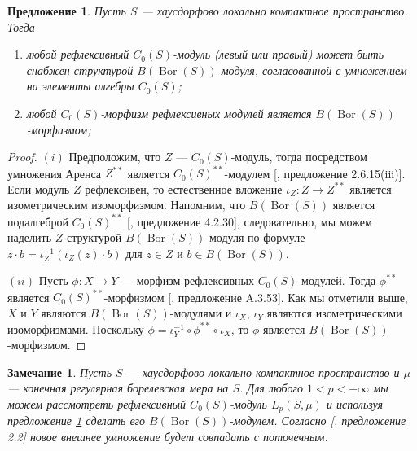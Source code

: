 \documentclass[12pt]{article}
\newtheorem{proposition}[theorem]{Предложение}
\newtheorem{remark}[theorem]{Замечание}
\begin{document}
\begin{proposition}\label{C0SMorphBtwnReflxSpIsBMorph}
    Пусть $S$ --- хаусдорфово локально компактное пространство. Тогда 
    \begin{enumerate}[label = (\roman*)]
        \item любой рефлексивный $C_0(S)$-модуль (левый или правый) может быть 
        снабжен структурой $B(\operatorname{Bor}(S))$-модуля, согласованной 
        с умножением на элементы алгебры $C_0(S)$;
        \item любой $C_0(S)$-морфизм рефлексивных модулей 
        является $B(\operatorname{Bor}(S))$-морфизмом;
    \end{enumerate}     
\end{proposition}
\begin{proof} 
    $(i)$ Предположим, что $Z$ --- $C_0(S)$-модуль, тогда посредством умножения 
    Аренса $Z^{**}$ является $C_0(S)^{**}$-модулем 
    [\cite{DalBanAlgAutCont}, предложение 2.6.15(iii)]. Если модуль $Z$ 
    рефлексивен, то естественное вложение $\iota_Z:Z\to Z^{**}$ является 
    изометрическим изоморфизмом. Напомним, что $B(\operatorname{Bor}(S))$ 
    является подалгеброй $C_0(S)^{**}$ 
    [\cite{DalBanAlgAutCont}, предложение 4.2.30], следовательно, мы можем 
    наделить $Z$ структурой $B(\operatorname{Bor}(S))$-модуля по 
    формуле $z\cdot b=\iota_Z^{-1}(\iota_Z(z)\cdot b)$ для $z\in Z$ 
    и $b\in B(\operatorname{Bor}(S))$.
    
    $(ii)$ Пусть $\phi:X\to Y$ --- морфизм рефлексивных $C_0(S)$-модулей. 
    Тогда $\phi^{**}$ является $C_0(S)^{**}$-морфизмом 
    [\cite{DalBanAlgAutCont}, предложение A.3.53]. Как мы отметили 
    выше, $X$ и $Y$ являются $B(\operatorname{Bor}(S))$-модулями 
    и $\iota_X$, $\iota_Y$ являются изометрическими изоморфизмами. 
    Поскольку $\phi=\iota_Y^{-1}\circ \phi^{**}\circ \iota_X$, то $\phi$ 
    является $B(\operatorname{Bor}(S))$-морфизмом.
\end{proof}

\begin{remark}\label{C0SModIsBBorSMod}
    Пусть $S$ --- хаусдорфово локально компактное пространство и $\mu$ --- 
    конечная регулярная борелевская мера на $S$. Для любого $1<p<+\infty$ мы 
    можем рассмотреть рефлексивный $C_0(S)$-модуль $L_p(S,\mu)$ и используя 
    предложение \ref{C0SMorphBtwnReflxSpIsBMorph} сделать 
    его $B(\operatorname{Bor}(S))$-модулем. 
    Согласно [\cite{HelTensProdAndMultModLp}, предложение 2.2] новое внешнее 
    умножение будет совпадать с поточечным.
\end{remark}
\end{document}
